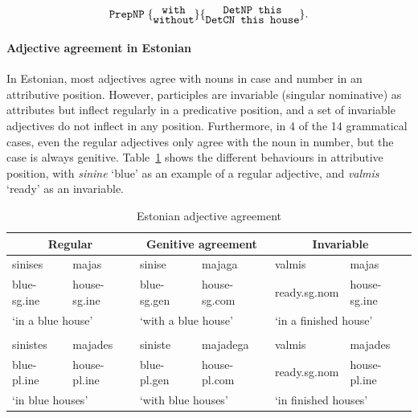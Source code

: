 \[
\t{PrepNP}\; \{ \stackanchor{\tt with}{\tt without} \} 
           \{ \stackanchor{\tt DetNP this}{\tt DetCN this house} \}. 
\]

\paragraph{Adjective agreement in Estonian} In Estonian,
most adjectives agree with nouns in case and number in an attributive
position. However, participles are invariable (singular nominative) as 
attributes but inflect regularly in a predicative position, and a set
of invariable adjectives do not inflect in any position. Furthermore,
in 4 of the 14 grammatical cases, even the regular adjectives only
agree with the noun in number, but the case is always genitive.
Table~\ref{estonian} shows the different behaviours in attributive
position, with \emph{sinine} `blue' as an example of a regular
adjective, and \emph{valmis} `ready' as an invariable.

\begin{table}[h]
\small
\begin{tabular}{ll | ll | ll}

\multicolumn{2}{c|}{\bf Regular} & \multicolumn{2}{c|}{\bf Genitive
                                   agreement} & \multicolumn{2}{c}{\bf
                                                Invariable} \\ \hline
 sinises & majas &  sinise & majaga &  valmis & majas \\
blue-{\sc sg.ine} & house-{\sc sg.ine} & blue-{\sc sg.gen} & house-{\sc sg.com} &  ready.{\sc sg.nom} & house-{\sc sg.ine} \\
\multicolumn{2}{l|}{`in a blue house'} & \multicolumn{2}{l|}{`with a blue house'} & \multicolumn{2}{l}{`in a finished house'} \\
 & & & & & \\
sinistes & majades & siniste & majadega & valmis & majades \\
blue-{\sc pl.ine} & house-{\sc pl.ine} & blue-{\sc pl.gen} & house-{\sc pl.com} & ready.{\sc sg.nom} & house-{\sc pl.ine} \\
\multicolumn{2}{l|}{`in blue houses'} & \multicolumn{2}{l|}{`with blue
                                         houses'} &
                                                     \multicolumn{2}{l}{`in finished houses'}

\end{tabular}
\caption{Estonian adjective agreement}
\label{estonian}
\end{table}

